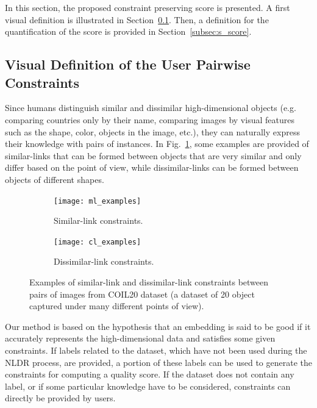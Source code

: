 In this section, the proposed constraint preserving score is presented. A first visual definition is illustrated in Section~\ref{subsec:visual_def}. Then, a definition for the quantification of the score is provided in Section~\ref{subsec:s_score}.

\subsection{Visual Definition of the User Pairwise Constraints}\label{subsec:visual_def}

Since humans distinguish similar and dissimilar high-dimensional objects (e.g. comparing countries only by their name, comparing images by visual features such as the shape, color, objects in the image, etc.), they can naturally express their knowledge with pairs of instances.
In Fig.~\ref{fig:ml_cl_examples}, some examples are provided of similar-links that can be formed between objects that are very similar and only differ based on the point of view, while dissimilar-links can be formed between objects of different shapes.

\begin{figure}
    \centering
    \begin{subfigure}[c]{0.48\linewidth}
        \texttt{[image: ml\_examples]}
        \caption{\footnotesize{Similar-link constraints.}}
    \end{subfigure}
    \begin{subfigure}[c]{0.48\linewidth}
        \texttt{[image: cl\_examples]}
        \caption{\footnotesize{Dissimilar-link constraints.}}
    \end{subfigure}
    \caption{Examples of similar-link and dissimilar-link constraints between pairs of images from COIL20 dataset (a dataset of 20 object captured under many different points of view).}
    \label{fig:ml_cl_examples}
\end{figure}

Our method is based on the hypothesis that an embedding is said to be good if it accurately represents the high-dimensional data and satisfies some given constraints.
If labels related to the dataset, which have not been used during the NLDR process, are provided, a portion of these labels can be used to generate the constraints for computing a quality score.
If the dataset does not contain any label, or if some particular knowledge have to be considered, constraints can directly be provided by users.

